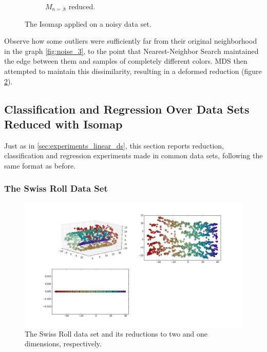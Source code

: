 \documentclass[12pt]{article}
\begin{document}
\begin{description}
\begin{figure}[H]
\begin{subfigure}{.6\linewidth}
			\captionsetup{justification=centering}
			\caption{$M_{n=.8}$ reduced.}
			\label{fig:noise_2}
		\end{subfigure}
		\captionsetup{justification=centering}
		\caption{The Isomap applied on a noisy data set.}
	\end{figure}
	
	Observe how some outliers were sufficiently far from their original neighborhood in the graph \ref{fig:noise_3}, to the point that Nearest-Neighbor Search maintained the edge between them and samples of completely different colors. MDS then attempted to maintain this dissimilarity, resulting in a deformed reduction (figure \ref{fig:noise_2}).
\end{description}

\subsection{Classification and Regression Over Data Sets Reduced with Isomap}

Just as in \ref{sec:experiments_linear_ds}, this section reports reduction, classification and regression experiments made in common data sets, following the same format as before.

\subsubsection{The Swiss Roll Data Set}

\begin{figure}[H]
	\centering
	\includegraphics[width=\linewidth]{swiss_isomap}
	\captionsetup{justification=centering}
	\caption{The Swiss Roll data set and its reductions to two and one dimensions, respectively.}
\end{figure}
\end{document}
